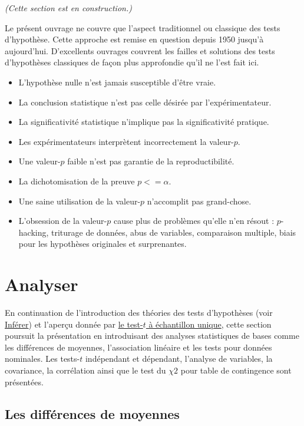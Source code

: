 \documentclass[
]{book}
\providecommand{\tightlist}{%
  \setlength{\itemsep}{0pt}\setlength{\parskip}{0pt}}
\begin{document}
\emph{(Cette section est en construction.)}

Le présent ouvrage ne couvre que l'aspect traditionnel ou classique des tests d'hypothèse. Cette approche est remise en question depuis 1950 jusqu'à aujourd'hui. D'excellents ouvrages couvrent les failles et solutions des tests d'hypothèses classiques de façon plus approfondie qu'il ne l'est fait ici.

\begin{itemize}
\tightlist
\item
  L'hypothèse nulle n'est jamais susceptible d'être vraie.
\item
  La conclusion statistique n'est pas celle désirée par l'expérimentateur.
\item
  La significativité statistique n'implique pas la significativité pratique.
\item
  Les expérimentateurs interprètent incorrectement la valeur-\(p\).
\item
  Une valeur-\(p\) faible n'est pas garantie de la reproductibilité.
\item
  La dichotomisation de la preuve \(p<=\alpha\).
\item
  Une saine utilisation de la valeur-\(p\) n'accomplit pas grand-chose.
\item
  L'obsession de la valeur-\(p\) cause plus de problèmes qu'elle n'en résout : \(p\)-hacking, triturage de données, abus de variables, comparaison multiple, biais pour les hypothèses originales et surprenantes.
\end{itemize}

\hypertarget{analyser}{%
\chapter{Analyser}\label{analyser}}

En continuation de l'introduction des théories des tests d'hypothèses (voir \protect\hyperlink{infuxe9rer}{Inférer}) et l'aperçu donnée par \protect\hyperlink{le-test-t-uxe0-uxe9chantillon-unique}{le test-\(t\) à échantillon unique}, cette section poursuit la présentation en introduisant des analyses statistiques de bases comme les différences de moyennes, l'association linéaire et les tests pour données nominales. Les tests-\(t\) indépendant et dépendant, l'analyse de variables, la covariance, la corrélation ainsi que le test du \(\chi2\) pour table de contingence sont présentées.

\hypertarget{les-diffuxe9rences-de-moyennes}{%
\section{Les différences de moyennes}\label{les-diffuxe9rences-de-moyennes}}
\end{document}
